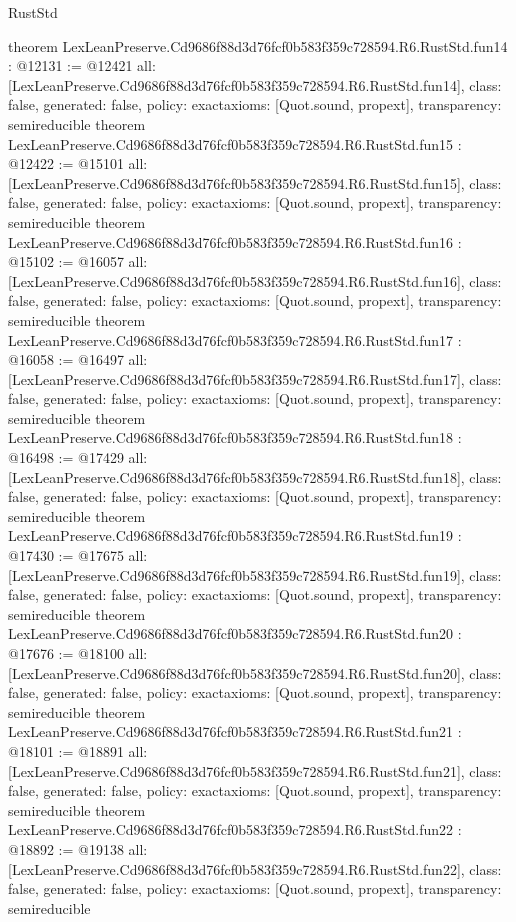\begin{lexlean}{RustStd}
\begin{coremodule}
{}
theorem LexLeanPreserve.Cd9686f88d3d76fcf0b583f359c728594.R6.RustStd.fun14 : @12131 := @12421 {
  all: [LexLeanPreserve.Cd9686f88d3d76fcf0b583f359c728594.R6.RustStd.fun14],
  class: false,
  generated: false,
  policy: exact{axioms: [Quot.sound, propext]},
  transparency: semireducible
}
theorem LexLeanPreserve.Cd9686f88d3d76fcf0b583f359c728594.R6.RustStd.fun15 : @12422 := @15101 {
  all: [LexLeanPreserve.Cd9686f88d3d76fcf0b583f359c728594.R6.RustStd.fun15],
  class: false,
  generated: false,
  policy: exact{axioms: [Quot.sound, propext]},
  transparency: semireducible
}
theorem LexLeanPreserve.Cd9686f88d3d76fcf0b583f359c728594.R6.RustStd.fun16 : @15102 := @16057 {
  all: [LexLeanPreserve.Cd9686f88d3d76fcf0b583f359c728594.R6.RustStd.fun16],
  class: false,
  generated: false,
  policy: exact{axioms: [Quot.sound, propext]},
  transparency: semireducible
}
theorem LexLeanPreserve.Cd9686f88d3d76fcf0b583f359c728594.R6.RustStd.fun17 : @16058 := @16497 {
  all: [LexLeanPreserve.Cd9686f88d3d76fcf0b583f359c728594.R6.RustStd.fun17],
  class: false,
  generated: false,
  policy: exact{axioms: [Quot.sound, propext]},
  transparency: semireducible
}
theorem LexLeanPreserve.Cd9686f88d3d76fcf0b583f359c728594.R6.RustStd.fun18 : @16498 := @17429 {
  all: [LexLeanPreserve.Cd9686f88d3d76fcf0b583f359c728594.R6.RustStd.fun18],
  class: false,
  generated: false,
  policy: exact{axioms: [Quot.sound, propext]},
  transparency: semireducible
}
theorem LexLeanPreserve.Cd9686f88d3d76fcf0b583f359c728594.R6.RustStd.fun19 : @17430 := @17675 {
  all: [LexLeanPreserve.Cd9686f88d3d76fcf0b583f359c728594.R6.RustStd.fun19],
  class: false,
  generated: false,
  policy: exact{axioms: [Quot.sound, propext]},
  transparency: semireducible
}
theorem LexLeanPreserve.Cd9686f88d3d76fcf0b583f359c728594.R6.RustStd.fun20 : @17676 := @18100 {
  all: [LexLeanPreserve.Cd9686f88d3d76fcf0b583f359c728594.R6.RustStd.fun20],
  class: false,
  generated: false,
  policy: exact{axioms: [Quot.sound, propext]},
  transparency: semireducible
}
theorem LexLeanPreserve.Cd9686f88d3d76fcf0b583f359c728594.R6.RustStd.fun21 : @18101 := @18891 {
  all: [LexLeanPreserve.Cd9686f88d3d76fcf0b583f359c728594.R6.RustStd.fun21],
  class: false,
  generated: false,
  policy: exact{axioms: [Quot.sound, propext]},
  transparency: semireducible
}
theorem LexLeanPreserve.Cd9686f88d3d76fcf0b583f359c728594.R6.RustStd.fun22 : @18892 := @19138 {
  all: [LexLeanPreserve.Cd9686f88d3d76fcf0b583f359c728594.R6.RustStd.fun22],
  class: false,
  generated: false,
  policy: exact{axioms: [Quot.sound, propext]},
  transparency: semireducible
}
\end{coremodule}
\end{lexlean}
